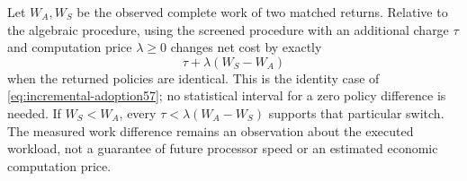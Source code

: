 Let $W_A,W_S$ be the observed complete work of two matched returns. Relative to the algebraic procedure, using the screened procedure with an additional charge $\tau$ and computation price $\lambda\ge0$ changes net cost by exactly
\begin{equation}\label{eq:net-work58}
 \tau+\lambda(W_S-W_A)
\end{equation}
when the returned policies are identical. This is the identity case of \eqref{eq:incremental-adoption57}; no statistical interval for a zero policy difference is needed. If $W_S<W_A$, every $\tau<\lambda(W_A-W_S)$ supports that particular switch. The measured work difference remains an observation about the executed workload, not a guarantee of future processor speed or an estimated economic computation price.
